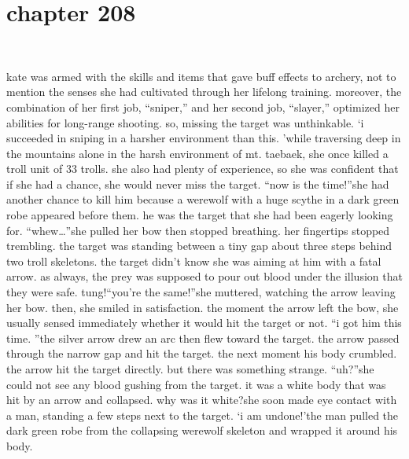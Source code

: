 \section{chapter 208}

                             




kate was armed with the skills and items that gave buff effects to archery, not to mention the senses she had cultivated through her lifelong training.
moreover, the combination of her first job, “sniper,” and her second job, “slayer,” optimized her abilities for long-range shooting.
 so, missing the target was unthinkable.
‘i succeeded in sniping in a harsher environment than this.
’while traversing deep in the mountains alone in the harsh environment of mt.
 taebaek, she once killed a troll unit of 33 trolls.
 she also had plenty of experience, so she was confident that if she had a chance, she would never miss the target.
“now is the time!”she had another chance to kill him because a werewolf with a huge scythe in a dark green robe appeared before them.
 he was the target that she had been eagerly looking for.
“whew…”she pulled her bow then stopped breathing.
 her fingertips stopped trembling.
the target was standing between a tiny gap about three steps behind two troll skeletons.
the target didn’t know she was aiming at him with a fatal arrow.
 as always, the prey was supposed to pour out blood under the illusion that they were safe.
tung!“you’re the same!”she muttered, watching the arrow leaving her bow.
 then, she smiled in satisfaction.
the moment the arrow left the bow, she usually sensed immediately whether it would hit the target or not.
“i got him this time.
”the silver arrow drew an arc then flew toward the target.
 the arrow passed through the narrow gap and hit the target.
 the next moment his body crumbled.
 the arrow hit the target directly.
but there was something strange.
“uh?”she could not see any blood gushing from the target.
it was a white body that was hit by an arrow and collapsed.
 why was it white?she soon made eye contact with a man, standing a few steps next to the target.
‘i am undone!’the man pulled the dark green robe from the collapsing werewolf skeleton and wrapped it around his body.

